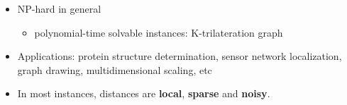 \documentclass[hyperref={pdfpagelabels=false},table,9pt,compress]{beamer}
\begin{document}
\begin{CJK*}{GBK}{kai}
{\begin{itemize}
  \item NP-hard in general \pause
    \begin{itemize}
      \item polynomial-time solvable instances: K-trilateration graph %
    \end{itemize}\pause
  \item Applications: protein structure determination, sensor network localization, graph drawing, multidimensional scaling, etc
      \vskip-3mm
      \begin{figure}
        \centering
        \hspace{5mm}
        \hspace{5mm}
      \end{figure} \pause
  \item In most instances, distances are \textbf{local}, \textbf{sparse} and \textbf{noisy}.
\end{itemize}
}
%



\end{CJK*}
\end{document}
